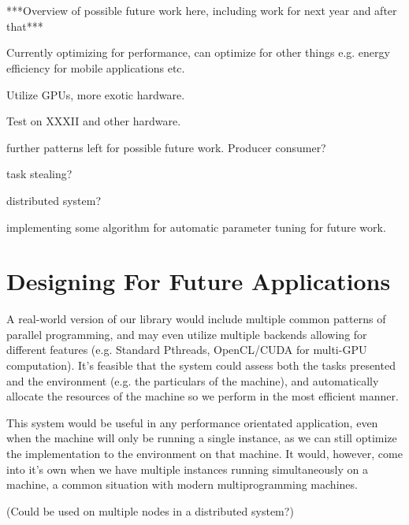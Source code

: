 \section{}

***Overview of possible future work here, including work for next year and after that***

Currently optimizing for performance, can  optimize for other things e.g. energy efficiency for mobile applications etc.

Utilize GPUs, more exotic hardware.

Test on XXXII and other hardware.

further patterns left for possible future work. Producer consumer?

task stealing?

distributed system?

implementing some algorithm for automatic parameter tuning for future work.

\section{Designing For Future Applications}

A real-world version of our library would include multiple common patterns of parallel programming, and may even utilize multiple backends allowing for different features (e.g. Standard Pthreads, OpenCL/CUDA for multi-GPU computation). It's feasible that the system could assess both the tasks presented and the environment (e.g. the particulars of the machine), and automatically allocate the resources of the machine so we perform in the most efficient manner.

This system would be useful in any performance orientated application, even when the machine will only be running a single instance, as we can still optimize the implementation to the environment on that machine. It would, however, come into it's own when we have multiple instances running simultaneously on a machine, a common situation with modern multiprogramming machines.

(Could be used on multiple nodes in a distributed system?)